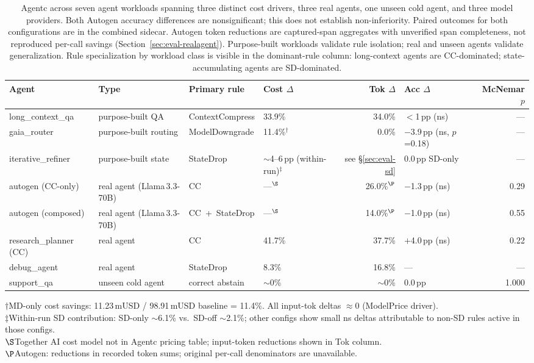\begin{table}[t]
\caption{Agentc across seven agent workloads spanning three distinct cost drivers,
three real agents, one unseen cold agent, and three model providers.
Both Autogen accuracy differences are nonsignificant; this does not establish
non-inferiority. Paired outcomes for both configurations are in the combined
sidecar. Autogen token reductions are captured-span aggregates with unverified
span completeness, not reproduced per-call savings
(Section~\ref{sec:eval-realagent}).
Purpose-built workloads validate rule isolation;
real and unseen agents validate generalization. Rule specialization by workload class
is visible in the dominant-rule column: long-context agents are CC-dominated;
state-accumulating agents are SD-dominated.}
\label{tab:summary}
\footnotesize
\begin{tabularx}{\textwidth}{@{} L L L L r L r @{}}
\toprule
Agent & Type & Primary rule & Cost $\Delta$ & Tok $\Delta$ & Acc $\Delta$ & McNemar $p$ \\
\midrule
long\_context\_qa   & purpose-built QA      & ContextCompress      & 33.9\% & 34.0\% & $<$1\,pp (ns) & --- \\
gaia\_router        & purpose-built routing & ModelDowngrade       & 11.4\%$^\dagger$ &  0.0\% & $-$3.9\,pp (ns, $p$=0.18) & --- \\
iterative\_refiner  & purpose-built state   & StateDrop            & $\sim$4--6\,pp (within-run)$^\ddagger$ & see \S\ref{sec:eval-sd} & 0.0\,pp SD-only & --- \\
\midrule
autogen (CC-only)   & real agent (Llama\,3.3-70B)  & CC            & ---$^\S$ & 26.0\%$^\P$ & $-$1.3\,pp (ns) & 0.29 \\
autogen (composed)  & real agent (Llama\,3.3-70B)  & CC~+~StateDrop & ---$^\S$ & 14.0\%$^\P$ & $-$1.0\,pp (ns) & 0.55 \\
research\_planner (CC)  & real agent        & CC            & 41.7\% & 37.7\% & $+$4.0\,pp (ns) & 0.22 \\
debug\_agent        & real agent            & StateDrop            &  8.3\% & 16.8\% & --- & --- \\
\midrule
support\_qa         & unseen cold agent     & correct abstain      & $\sim$0\% & $\sim$0\% & 0.0\,pp & 1.000 \\
\bottomrule
\end{tabularx}
\footnotesize{$\dagger$MD-only cost savings: 11.23\,mUSD / 98.91\,mUSD baseline = 11.4\%. All input-tok deltas $\approx$0 (ModelPrice driver).}\\
\footnotesize{$\ddagger$Within-run SD contribution: SD-only $\sim$6.1\% vs.\ SD-off $\sim$2.1\%; other configs show small ns deltas attributable to non-SD rules active in those configs.}\\
\footnotesize{$\S$Together AI cost model not in Agentc pricing table; input-token reductions shown in Tok column.}\\
\footnotesize{$\P$Autogen: reductions in recorded token sums; original per-call denominators are unavailable.}
\end{table}

